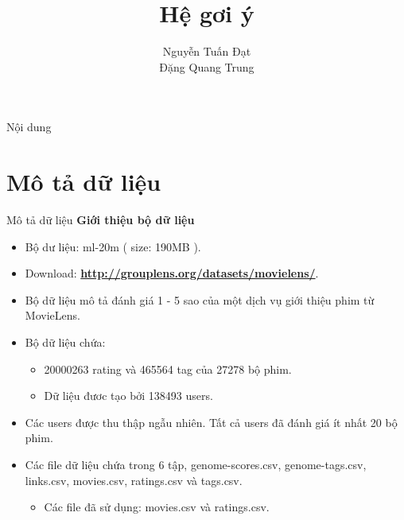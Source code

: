 \documentclass{beamer}
\title[]{{\huge \bf Hệ gơi ý}\\
  }
\author[]{
Nguyễn Tuấn Đạt\\%
Đặng Quang Trung\\
}
\institute[]{
}
\newcommand{\bi}{\begin{itemize}}
\newcommand{\ei}{\end{itemize}}
\begin{document}
\begin{frame}
\titlepage
\end{frame}

\begin{frame}{Nội dung}
\tableofcontents
\end{frame}
\section{Mô tả dữ liệu}
\begin{frame}{Mô tả dữ liệu}
\textbf{Giới thiệu bộ dữ liệu}
\bi
\item Bộ dư liệu: ml-20m ( size: 190MB ).
\item Download:\textbf{ \url{http://grouplens.org/datasets/movielens/}}.
\item Bộ dữ liệu mô tả đánh giá 1 - 5 sao của một dịch vụ giới thiệu phim từ MovieLens.
\item Bộ dữ liệu chứa:
\bi
\item 20000263 rating và 465564 tag của 27278 bộ phim.
\item Dữ liệu đươc tạo bởi 138493  users.
\ei
\item Các users được thu thập ngẫu nhiên. Tất cả users đã đánh giá ít nhất 20 bộ phim.
\item Các file dữ liệu chứa trong 6 tập, genome-scores.csv, genome-tags.csv, links.csv, movies.csv, ratings.csv và tags.csv. 
\bi
\item Các file đã sử dụng: movies.csv và ratings.csv.
\ei
\ei
\end{frame}
\end{document}
